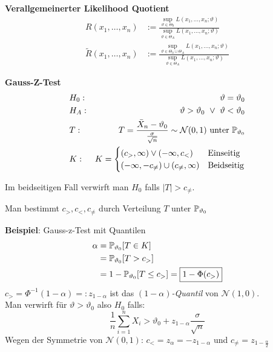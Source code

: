  \textbf{Verallgemeinerter Likelihood Quotient}
\begin{align*}
    R(x_1,\ldots,x_n)           &:= \frac{\underset{\vartheta\in\Theta_0}{\sup} L(x_1,\ldots,x_n;\vartheta)}{\underset{\vartheta\in\Theta_A}{\sup}L(x_1,\ldots,x_n;\vartheta)} \\
    \tilde{R}(x_1,\ldots,x_n)   &:= \frac{\underset{\vartheta\in\Theta_0\cup\Theta_A}{\sup} L(x_1,\ldots,x_n;\vartheta)}{\underset{\vartheta\in\Theta_A}{\sup}L(x_1,\ldots,x_n;\vartheta)}
\end{align*}

\newpage 

 \textbf{Gauss-Z-Test}\\
\begin{align*}
    & H_0:  & \vartheta = \vartheta_0 \\
    & H_A:  & \vartheta > \vartheta_0 \ \lor \ \vartheta < \vartheta_0 \\
    & T:    & T=\frac{\bar{X}_n-\vartheta_0}{\frac{\sigma}{\sqrt{n}}}\sim\mathcal N (0,1) \text{ unter } \P_{\vartheta_0} \\
    & K:    & K=\begin{cases}
        (c_>,\infty) \lor (-\infty, c_<)        & \text{Einseitig} \\
        (-\infty, -c_{\neq}) \cup (c_{\neq},\infty) & \text{Beidseitig}
    \end{cases}
\end{align*}

{\footnotesize
    \remark Im beidseitigen Fall verwirft man $H_0$ falls $|T|>c_{\neq}$.

    \remark Man bestimmt $c_>,c_<,c_{\neq}$ durch Verteilung $T$ unter $\P_{\vartheta_0}$
}

{\scriptsize
    \textbf{Beispiel}: Gauss-z-Test mit Quantilen
    \begin{align*}
        \alpha  &= \P_{\vartheta_0}[T\in K]     \\
                &= \P_{\vartheta_0}[T > c_>]    \\ 
                &= 1-\P_{\vartheta_0}[T \leq c_>] = \boxed{1-\Phi(c_>)}
    \end{align*}
    $c_> = \Phi^{-1}(1-\alpha) =: z_{1-\alpha}$ ist das \textit{$(1-\alpha)$-Quantil} von $\mathcal{N}(1,0)$.\\ 
    Man verwirft für $\vartheta > \vartheta_0$ also $H_0$ falls:
    $$
        \frac{1}{n}\sum_{i=1}^nX_i > \vartheta_0 + z_{1-\alpha}\frac{\sigma}{\sqrt{n}}
    $$
    Wegen der Symmetrie von $\mathcal N (0,1)$: $c_< = z_\alpha = -z_{1-\alpha}$ und $c_{\neq}=z_{1-\frac{\alpha}{2}}$
}


